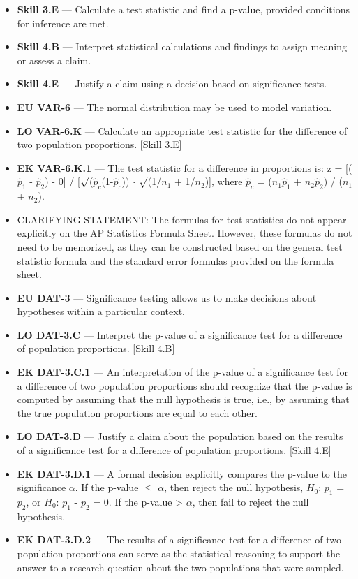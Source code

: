 \documentclass[11pt]{article}
\begin{document}


{\small
\begin{itemize}[leftmargin=1.5em,itemsep=2pt,topsep=2pt]
  \item \textbf{Skill 3.E} --- Calculate a test statistic and find a p-value, provided conditions for inference are met.
  \item \textbf{Skill 4.B} --- Interpret statistical calculations and findings to assign meaning or assess a claim.
  \item \textbf{Skill 4.E} --- Justify a claim using a decision based on significance tests.
  \item \textbf{EU VAR-6} --- The normal distribution may be used to model variation.
  \item \textbf{LO VAR-6.K} --- Calculate an appropriate test statistic for the difference of two population proportions. [Skill 3.E]
  \item \textbf{EK VAR-6.K.1} --- The test statistic for a difference in proportions is: z = [($\widehat p_1$ - $\widehat p_2$) - 0] / [$\surd$($\widehat p_c$(1-$\widehat p_c$)) $\cdot$ $\surd$(1/$n_1$ + 1/$n_2$)], where $\widehat p_c$ = ($n_1$$\widehat p_1$ + $n_2$$\widehat p_2$) / ($n_1$ + $n_2$).
  \item CLARIFYING STATEMENT: The formulas for test statistics do not appear explicitly on the AP Statistics Formula Sheet. However, these formulas do not need to be memorized, as they can be constructed based on the general test statistic formula and the standard error formulas provided on the formula sheet.
  \item \textbf{EU DAT-3} --- Significance testing allows us to make decisions about hypotheses within a particular context.
  \item \textbf{LO DAT-3.C} --- Interpret the p-value of a significance test for a difference of population proportions. [Skill 4.B]
  \item \textbf{EK DAT-3.C.1} --- An interpretation of the p-value of a significance test for a difference of two population proportions should recognize that the p-value is computed by assuming that the null hypothesis is true, i.e., by assuming that the true population proportions are equal to each other.
  \item \textbf{LO DAT-3.D} --- Justify a claim about the population based on the results of a significance test for a difference of population proportions. [Skill 4.E]
  \item \textbf{EK DAT-3.D.1} --- A formal decision explicitly compares the p-value to the significance $\alpha$. If the p-value $\leq$ $\alpha$, then reject the null hypothesis, $H_0$: $p_1$ = $p_2$, or $H_0$: $p_1$ - $p_2$ = 0. If the p-value > $\alpha$, then fail to reject the null hypothesis.
  \item \textbf{EK DAT-3.D.2} --- The results of a significance test for a difference of two population proportions can serve as the statistical reasoning to support the answer to a research question about the two populations that were sampled.
\end{itemize}
}
\end{document}
